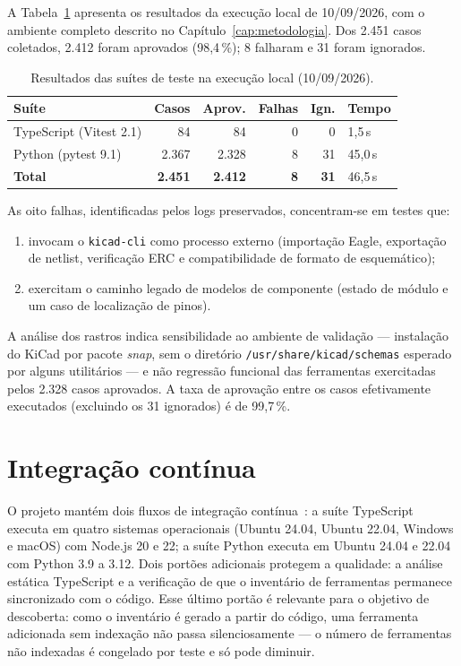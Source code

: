 A Tabela~\ref{tab:testes-mono} apresenta os resultados da execução local de
10/09/2026, com o ambiente completo descrito no
Capítulo~\ref{cap:metodologia}. Dos 2.451 casos coletados, 2.412 foram
aprovados (98,4\,\%); 8 falharam e 31 foram ignorados.

\begin{table}[htbp]
\centering
\small
\caption{Resultados das suítes de teste na execução local (10/09/2026).}
\label{tab:testes-mono}
\begin{tabular}{@{}p{4.6cm}rrrrp{2.2cm}@{}}
\toprule
\textbf{Suíte} & \textbf{Casos} & \textbf{Aprov.} & \textbf{Falhas} & \textbf{Ign.} & \textbf{Tempo} \\
\midrule
TypeScript (Vitest 2.1) & 84 & 84 & 0 & 0 & 1,5\,s \\
Python (pytest 9.1) & 2.367 & 2.328 & 8 & 31 & 45,0\,s \\
\midrule
\textbf{Total} & \textbf{2.451} & \textbf{2.412} & \textbf{8} & \textbf{31} & 46,5\,s \\
\bottomrule
\end{tabular}
\end{table}

As oito falhas, identificadas pelos logs preservados, concentram-se em testes
que:

\begin{enumerate}[leftmargin=1.4em,itemsep=0.2em]
  \item invocam o \texttt{kicad-cli} como processo externo (importação Eagle,
        exportação de netlist, verificação ERC e compatibilidade de formato
        de esquemático);
  \item exercitam o caminho legado de modelos de componente (estado de
        módulo e um caso de localização de pinos).
\end{enumerate}

A análise dos rastros indica sensibilidade ao ambiente de validação ---
instalação do KiCad por pacote \emph{snap}, sem o diretório
\texttt{/usr/share/kicad/schemas} esperado por alguns utilitários --- e não
regressão funcional das ferramentas exercitadas pelos 2.328 casos aprovados.
A taxa de aprovação entre os casos efetivamente executados (excluindo os 31
ignorados) é de 99,7\,\%.

\section{Integração contínua}

O projeto mantém dois fluxos de integração contínua~\cite{githubactions}: a
suíte TypeScript
executa em quatro sistemas operacionais (Ubuntu 24.04, Ubuntu 22.04, Windows e
macOS) com Node.js 20 e 22; a suíte Python executa em Ubuntu 24.04 e 22.04 com
Python 3.9 a 3.12. Dois portões adicionais protegem a qualidade: a análise
estática TypeScript e a verificação de que o inventário de ferramentas
permanece sincronizado com o código. Esse último portão é relevante para o
objetivo de descoberta: como o inventário é gerado a partir do código, uma
ferramenta adicionada sem indexação não passa silenciosamente --- o número de
ferramentas não indexadas é congelado por teste e só pode diminuir.

